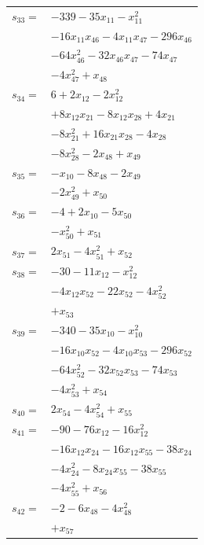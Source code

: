 \begin{longtable}{@{}r@{\;}l@{}}
\(s_{33}=\) & \(\displaystyle -339 -35x_{11} -x_{11}^{2}\) \\
 & \(\displaystyle -16x_{11}x_{46} -4x_{11}x_{47} -296x_{46}\) \\
 & \(\displaystyle -64x_{46}^{2} -32x_{46}x_{47} -74x_{47}\) \\
 & \(\displaystyle -4x_{47}^{2} +x_{48}\) \\[3pt]
\(s_{34}=\) & \(\displaystyle 6 +2x_{12} -2x_{12}^{2}\) \\
 & \(\displaystyle +8x_{12}x_{21} -8x_{12}x_{28} +4x_{21}\) \\
 & \(\displaystyle -8x_{21}^{2} +16x_{21}x_{28} -4x_{28}\) \\
 & \(\displaystyle -8x_{28}^{2} -2x_{48} +x_{49}\) \\[3pt]
\(s_{35}=\) & \(\displaystyle -x_{10} -8x_{48} -2x_{49}\) \\
 & \(\displaystyle -2x_{49}^{2} +x_{50}\) \\[3pt]
\(s_{36}=\) & \(\displaystyle -4 +2x_{10} -5x_{50}\) \\
 & \(\displaystyle -x_{50}^{2} +x_{51}\) \\[3pt]
\(s_{37}=\) & \(\displaystyle 2x_{51} -4x_{51}^{2} +x_{52}\) \\[3pt]
\(s_{38}=\) & \(\displaystyle -30 -11x_{12} -x_{12}^{2}\) \\
 & \(\displaystyle -4x_{12}x_{52} -22x_{52} -4x_{52}^{2}\) \\
 & \(\displaystyle +x_{53}\) \\[3pt]
\(s_{39}=\) & \(\displaystyle -340 -35x_{10} -x_{10}^{2}\) \\
 & \(\displaystyle -16x_{10}x_{52} -4x_{10}x_{53} -296x_{52}\) \\
 & \(\displaystyle -64x_{52}^{2} -32x_{52}x_{53} -74x_{53}\) \\
 & \(\displaystyle -4x_{53}^{2} +x_{54}\) \\[3pt]
\(s_{40}=\) & \(\displaystyle 2x_{54} -4x_{54}^{2} +x_{55}\) \\[3pt]
\(s_{41}=\) & \(\displaystyle -90 -76x_{12} -16x_{12}^{2}\) \\
 & \(\displaystyle -16x_{12}x_{24} -16x_{12}x_{55} -38x_{24}\) \\
 & \(\displaystyle -4x_{24}^{2} -8x_{24}x_{55} -38x_{55}\) \\
 & \(\displaystyle -4x_{55}^{2} +x_{56}\) \\[3pt]
\(s_{42}=\) & \(\displaystyle -2 -6x_{48} -4x_{48}^{2}\) \\
 & \(\displaystyle +x_{57}\) \\[3pt]

\end{longtable}
